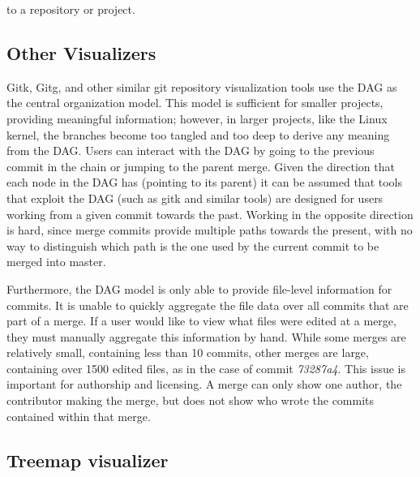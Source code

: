 \documentclass[conference, draftclsnofoot, draft]{IEEEtran}
\begin{document}
to a repository or project.

\subsection{Other Visualizers}

Gitk, Gitg, and other similar git repository visualization tools use the DAG as the
central organization model. This model is sufficient for smaller projects, providing
meaningful information; however, in larger projects, like the Linux kernel, the
branches become too tangled and too deep to derive any meaning from the DAG. Users
can interact with the DAG by going to the previous commit in the chain or jumping to
the parent merge. Given the direction that each node in the DAG has (pointing to its parent)
it can be assumed that tools that exploit the DAG (such as gitk and similar tools) are designed for users
working from a given commit towards the past. Working in the opposite direction is hard, since merge commits provide multiple paths towards the present, with no
way to distinguish which path is the one used by the current commit to be merged into master.

Furthermore, the DAG model is only able to provide file-level information for
commits. It is unable to quickly aggregate the file data over all commits that
are part of a merge. If a user would like to view what files were edited at a merge,
they must manually aggregate this information by hand. While some merges are
relatively small, containing less than 10 commits, other merges are large,
containing over 1500 edited files, as in the case of commit \textit{73287a4}. This
issue is important for authorship and licensing. A merge can only show one author,
the contributor making the merge, but does not show who wrote the commits contained
within that merge.



\subsection{Treemap visualizer}
\end{document}
